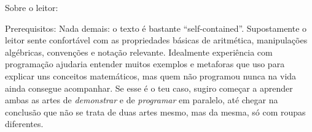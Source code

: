 \endsectionblah

\sectionblah Sobre o leitor:

\blah Prerequisitos:
Nada demais: o texto é bastante ``self-contained''.
Supostamente o leitor sente confortável com as propriedades básicas
de aritmética, manipulações algébricas, convenções e notação relevante.
Idealmente experiência com programação ajudaria entender muitos exemplos
e metaforas que uso para explicar uns conceitos matemáticos, mas quem
não programou nunca na vida ainda consegue acompanhar.
Se esse é o teu caso, sugiro começar a aprender ambas as artes de
\emph{demonstrar} e de \emph{programar} em paralelo, até chegar
na conclusão que não se trata de duas artes mesmo, mas da mesma,
só com roupas diferentes.

\endsectionblah

\endchapterblah
